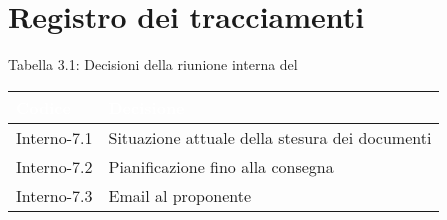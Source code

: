 \section{Registro dei tracciamenti}
{
Tabella 3.1: Decisioni della riunione interna del \Data{}
\renewcommand{\arraystretch}{1.5}
\centering
\begin{longtable}{C{3cm} C{9cm}}
\textcolor{white}{\textbf{Codice}}&
\textcolor{white}{\textbf{Decisione}}\\	
\endhead
		
Interno-7.1 & Situazione attuale della stesura dei documenti\\
Interno-7.2 & Pianificazione fino alla consegna\\
Interno-7.3 & Email al proponente\\

\end{longtable}
}
